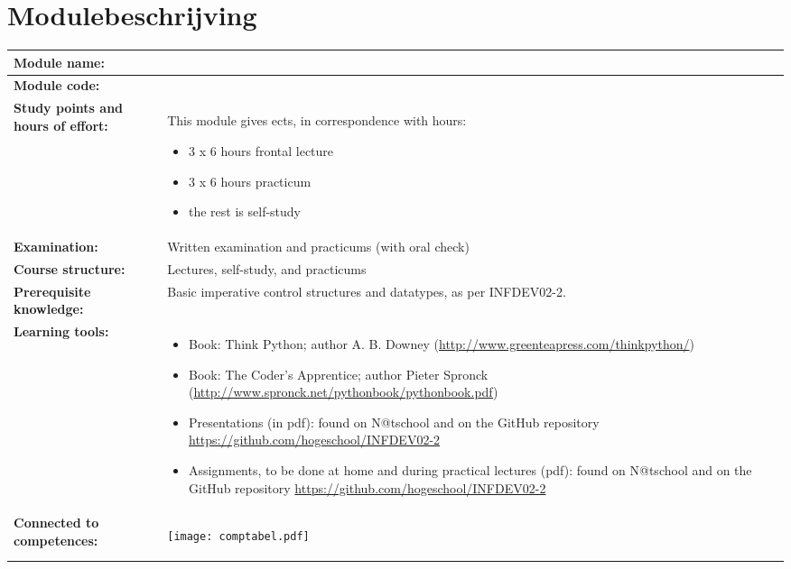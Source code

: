 \section*{Modulebeschrijving}
\begin{tabularx}{\textwidth}{|>{\columncolor{lichtGrijs}} p{}|X|}
	\hline
	\textbf{Module name:} & \modulenaam\\
	\hline
	\textbf{Module code: }& \modulecode\\
	\hline
	\textbf{Study points \newline and hours of effort:} & This module gives \stdPunten{}  ects, in correspondence with \FPeval{\result}{clip(\stdPunten*28)}\result{} hours:
	\begin{itemize}
		\item 3 x 6 hours frontal lecture
		\item 3 x 6 hours practicum
		\item the rest is self-study
	\end{itemize} \\
	\hline
	\textbf{Examination:} & Written examination and practicums (with oral check) \\
	\hline
	\textbf{Course structure:} & Lectures, self-study, and practicums \\
	\hline
	\textbf{Prerequisite knowledge:} & Basic imperative control structures and datatypes, as per INFDEV02-2. \\
	\hline
	\textbf{Learning tools:}  &
		\begin{itemize}
			\item Book: Think Python; author A. B. Downey (\url{http://www.greenteapress.com/thinkpython/})
			\item Book: The Coder’s Apprentice; author Pieter Spronck (\url{http://www.spronck.net/pythonbook/pythonbook.pdf})
			\item Presentations (in pdf): found on N@tschool and on the GitHub repository \url{https://github.com/hogeschool/INFDEV02-2}
			\item Assignments, to be done at home and during practical lectures (pdf): found on N@tschool and on the GitHub repository \url{https://github.com/hogeschool/INFDEV02-2}
		\end{itemize} \\
	\hline
	\textbf{Connected to \newline competences:} &
	\begin{center}
		\texttt{[image: comptabel.pdf]}
	\end{center}\\

\end{tabularx}
